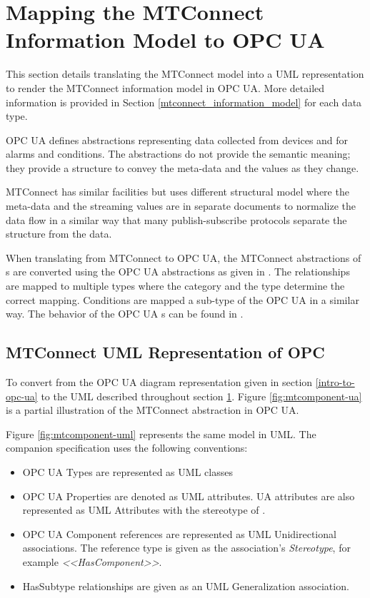 \section{Mapping the MTConnect Information Model to OPC UA} 
  \label{mtconnect-mapping}

This section details translating the MTConnect model into a UML representation to render the MTConnect information model in OPC UA. More detailed information is provided in Section \ref{mtconnect_information_model} for each data type.

OPC UA defines abstractions representing data collected from devices and for alarms and conditions. The abstractions do not provide the semantic meaning; they provide a structure to convey the meta-data and the values as they change. 

MTConnect has similar facilities but uses different structural model where the meta-data and the streaming values are in separate documents to normalize the data flow in a similar way that many publish-subscribe protocols separate the structure from the data.

When translating from MTConnect to OPC UA, the MTConnect abstractions of s are converted using the OPC UA   abstractions as given in \cite{UAPart8}.  The relationships are mapped to multiple  types where the category and the type determine the correct mapping. Conditions are mapped a sub-type of the OPC UA  in a similar way. The behavior of the OPC UA s can be found in \cite{UAPart9}.

\subsection{MTConnect UML Representation of OPC}

To convert from the OPC UA diagram representation given in section \ref{intro-to-opc-ua} to the UML described throughout section \ref{mtconnect-mapping}. Figure \ref{fig:mtcomponent-ua} is a partial illustration of the MTConnect  abstraction in OPC UA.



Figure \ref{fig:mtcomponent-uml} represents the same model in UML. The companion specification uses the following conventions:

\begin{itemize}
\item OPC UA Types are represented as UML classes
\item OPC UA Properties are denoted as UML attributes. UA attributes are also represented as UML Attributes with the stereotype of .
\item OPC UA Component references are represented as UML Unidirectional associations. The reference type is given as the association's \textit{Stereotype}, for example \textit{<<HasComponent>>}. 
\item HasSubtype relationships are given as an UML Generalization association.  
\end{itemize}

